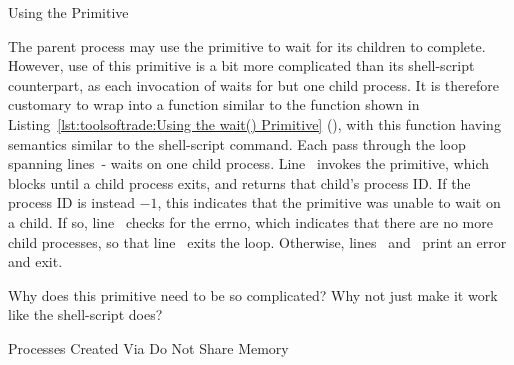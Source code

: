 \begin{listing}[tbp]

\caption{Using the  Primitive}
\label{lst:toolsoftrade:Using the wait() Primitive}
\end{listing}

\begin{lineref}
The parent process may use the  primitive to wait for its children
to complete.
However, use of this primitive is a bit more complicated than its shell-script
counterpart, as each invocation of  waits for but one child
process.
It is therefore customary to wrap  into a function similar
to the  function shown in
Listing~\ref{lst:toolsoftrade:Using the wait() Primitive}
(),
with this  function having semantics similar to the
shell-script  command.
Each pass through the loop spanning lines~-
waits on one child process.
Line~ invokes the  primitive, which blocks
until a child process exits, and returns that child's process ID.
If the process ID is instead $-1$, this indicates that the 
primitive was unable to wait on a child.
If so, line~ checks for the  errno, which
indicates that there are no more child processes, so that
line~ exits the loop.
Otherwise, lines~ and~ print an error and exit.
\end{lineref}

\QuickQuiz{}
	Why does this  primitive need to be so complicated?
	Why not just make it work like the shell-script  does?
 \QuickQuizEnd

\begin{listing}[tbp]

\caption{Processes Created Via  Do Not Share Memory}
\label{lst:toolsoftrade:Processes Created Via fork() Do Not Share Memory}
\end{listing}


